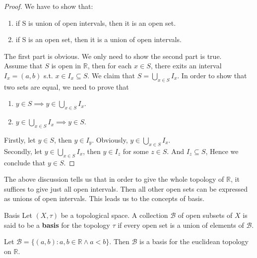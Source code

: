 \begin{proof}
    We have to show that:
    \begin{enumerate}

        \item if S is union of open intervals, then it is an open set.
        \item if S is an open set, then it is a union of open intervals.

    \end{enumerate}
    The first part is obvious. We only need to show the second part is true.\\
    Assume that $S$ is open in $\mathbb{R}$, then for each $x \in S$, there
    exits an interval $I_x = (a,b)$ s.t. $x \in I_x \subseteq S$.
    We claim that $S = \bigcup_{x \in S} I_x$. In order to show that
    two sets are equal, we need to prove that
    \begin{enumerate}

        \item $y \in S \implies y \in \bigcup_{x \in S} I_x$.
        \item $y \in \bigcup_{x \in S} I_x \implies y \in S$.

    \end{enumerate}
    Firstly, let $y \in S$, then $y \in I_y$. Obviously, $y \in
    \bigcup_{x \in S} I_x$.\\
    Secondly, let $y \in \bigcup_{x \in S} I_x$, then $y \in I_z$ for
    some $z \in S$. And $I_z \subseteq S$, Hence we conclude
    that $y \in S$.
\end{proof}

The above discussion tells us that in order to give the whole
topology of $\mathbb{R}$, it suffices to give just all open
intervals. Then all other open sets can be expressed as unions of
open intervals. This leads us to the concepts of basis.

\begin{definition}{Basis}{}
    Let $(X,\tau)$ be a topological space. A collection $\mathcal{B}$ of
    open subsets of $X$ is said to be a \textbf{basis} for the
    topology $\tau$ if every open set is a union of elements of $\mathcal{B}$.
\end{definition}

\begin{example}
    Let $\mathcal{B} = \{(a,b): a,b \in \mathbb{R} \land a < b\}$.
    Then $\mathcal{B}$ is a basis for the euclidean topology on $\mathbb{R}$.
\end{example}
